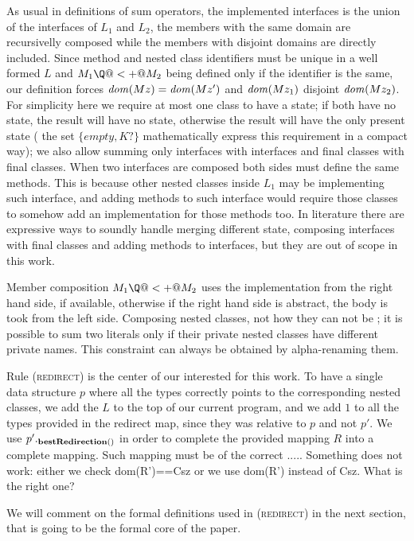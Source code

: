 As usual in definitions of sum operators,
the implemented interfaces is the union of the interfaces of $L_1$ and $L_2$, the members with the same domain are recursivelly composed while the members with disjoint domains are directly included.
Since method and nested class identifiers must be unique in a well formed $L$ and $M_1 \Q@<+@ M_2$  being defined only if the identifier is the same,
our definition forces $\mathit{dom}(Mz)=\mathit{dom}(Mz')$ and
$\mathit{dom}(Mz_1)$ disjoint $\mathit{dom}(Mz_2)$.
For simplicity here 
 we require at most one class to have a state; if both have no state, the result will have no state, otherwise the result will have the only present state (
the set $\{empty,K?\}$ mathematically express this requirement in a compact way);
we also allow summing
only interfaces with interfaces and final classes with final classes. When two interfaces are composed both sides must define the same methods.
This is because other nested classes inside $L_1$ may be implementing such interface, and adding methods to such interface would require those classes to somehow add an implementation for those methods too.
In literature there are expressive ways to soundly handle merging different state, composing interfaces with final classes and
adding methods to interfaces, but they are out of scope in this work.

Member composition $M_1 \Q@<+@ M_2$ uses
the implementation from the right hand side, if available,
otherwise if the right hand side is abstract, the body is took from the left side.
Composing nested classes, not how they can not be \Q@private@; it is possible to sum two literals only if their private nested classes have different private names. This constraint can always be obtained by alpha-renaming them.

Rule \textsc{(redirect)} is the center of our interested for this work. To have a single data structure $p$ where all the types correctly points to the corresponding nested classes, we add the $L$ to the top of our current program, and we add $1$ to all the types provided in the redirect map, since they was relative to $p$ and not $p'$.
We use $p'{._{\textbf{bestRedirection}({})}}$ in order
to complete the provided mapping $R$ into a complete mapping.
Such mapping must be of the correct .....
Something does not work: either we check dom(R')==Csz
or we use dom(R') instead of Csz. What is the right one?

We will comment on the formal definitions used in \textsc{(redirect)} in the next section, that is going to be the formal core of the paper.

